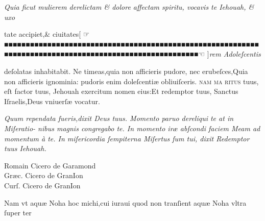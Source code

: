 \documentclass{article}
\newcommand{\threecolumntypefacenames}[3]{\begin{multicols}{3}
		\tiny
		\hfill \qquad \qquad \qquad \qquad #1\hspace*{\fill}\\
		\columnbreak
		\hfill #2\hspace*{\fill}\\
		\columnbreak
		\hfill #3\qquad \qquad \qquad \qquad \hspace*{\fill}
\end{multicols}}
\begin{document}
{\begin{multicols}{2}
	\columnbreak
	\fontsize{8}{9}\selectfont
	\justifying
	\noindent
	\textit{Quia ficut mulierem derelictam \& dolore affectam spiritu, vocavis te Iehouah, \& uxo}
\end{multicols}
\fontsize{8}{9}\selectfont
\vspace{-2.3\baselineskip}
\noindent tate accipiet,\& ciuitates\hfill\hfill {\normalsize [ ☞}\hfill ■■■■■■■■■■■■■■■■■■■■■■■■■■■■■■■■■■■■■■■■■■■■■■■■■■■■■■■■■■■■■■■■■■■■■■■■■■■■■■■■■■■■■■■■■■■■■■■■■■■■■■■■\hfill{\normalsize ☜ ]}\hfill \textit{rem Adoleſcentis}
\vspace{-1.2\baselineskip}
\begin{multicols}{2}
	\fontsize{8}{9}\selectfont
	\justifying
	\noindent deſolatas inhabitabit. Ne timeas,quia non afficieris pudore, nec erubeſces,Quia\linebreak
	non afficieris ignominia: pudoris enim doleſcenti\ae{} obliuiſceris. \textsc{nam ma\linebreak
		ritus} tuus, eſt factor tuus, Jehouah exercitum nomen eius:Et redemptor tuus,\linebreak
	Sanctus Iſraelis,Deus vniuerſ\ae{} vocatur.

	\columnbreak
	\fontsize{8}{9}\selectfont
	\justifying
	\noindent
	\textit{Quum rependata fueris,dixit Deus tuus. Momento paruo dereliqui te at in Miſeratio-\linebreak
		nibus magnis congregabo te. In momento ir\ae{} abſcondi faciem Meam ad momentum \`a te.\linebreak
		In miſericordia ſempiterna Miſertus ſum tui, dixit Redemptor tuus Iehouah.}
\end{multicols}
\threecolumntypefacenames{Romain Cicero de Garamond}{Gr\ae{}c. Cicero de GranIon}{Curſ. Cicero de GranIon}
\vspace{-2.5\baselineskip}
\begin{multicols}{2}
	\fontsize{7}{8}\selectfont
	\justifying
	\noindent \quad Nam vt aqu\ae{} Noha hoc michi,cui iuraui quod non tranſient aqu\ae{} Noha vltra ſuper ter\linebreak


\end{multicols}}
\end{document}
